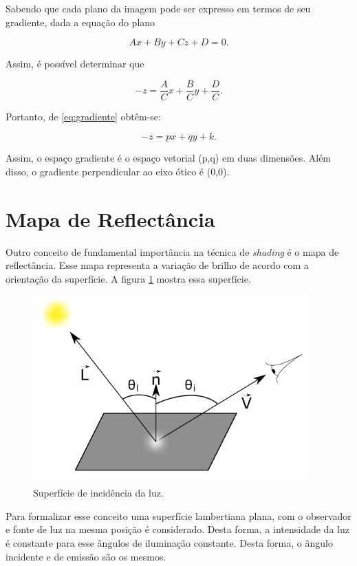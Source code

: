 \documentclass[
	12pt,				%
	openright,			%
	oneside,			%
	a4paper,			%
	brazil,				%
	]{abntex2}
\begin{document}
Sabendo que cada plano da imagem pode ser expresso em termos de seu gradiente, dada a equação do plano

\begin{equation} 
Ax+By+Cz+D=0.
\label{eq:eqplano}
\end{equation}

Assim, é possível determinar que

\begin{equation} 
-z = \frac{A}{C}x + \frac{B}{C}y + \frac{D}{C}.
\label{eq:eqplanoz}
\end{equation}

Portanto, de \ref{eq:gradiente} obtêm-se:

\begin{equation} 
-z = px + qy + k.
\label{eq:espacovetorial}
\end{equation}

Assim, o espaço gradiente é o espaço vetorial (p,q) em duas dimensões. Além disso, o gradiente perpendicular ao eixo ótico é (0,0).

\section{Mapa de Reflectância}

Outro conceito de fundamental importância na técnica de \textit{shading} é o mapa de reflectância. Esse mapa representa a variação de brilho de acordo com a orientação da superfície. A figura \ref{fig:superficie} mostra essa superfície.

\begin{figure}[h!]
\centering
\includegraphics[scale=0.4]{reflec.png}
\caption{Superfície de incidência da luz.}
\label{fig:superficie}
\end{figure}


Para formalizar esse conceito uma superfície lambertiana plana, com o observador e fonte de luz na mesma posição é considerado. Desta forma, a intensidade da luz é constante para esse ângulos de iluminação constante. Desta forma, o ângulo incidente e de emissão são os mesmos. 
\end{document}
